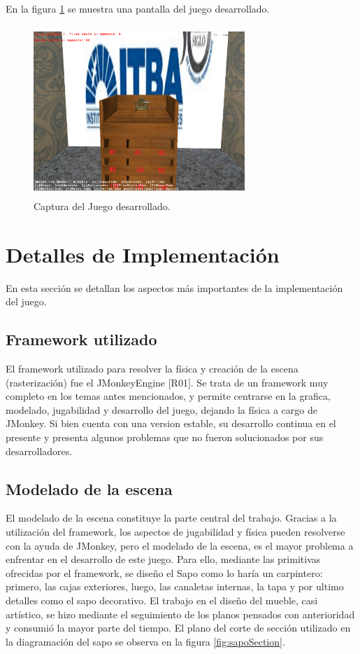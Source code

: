 \documentclass{acm_proc_article-sp}
\begin{document}
En la figura \ref{fig:sapoGame} se muestra una pantalla del juego desarrollado.

\begin{figure}[!ht]
	\centering
		\includegraphics[width=8cm,height=6.45cm]{img/simpleShoot.png}
	\caption{Captura del Juego desarrollado.}
	\label{fig:sapoGame}
\end{figure}


\section{Detalles de Implementaci\'on}
\label{sec:impl}

En esta secci\'on se detallan los aspectos m\'as importantes de la implementaci\'on del juego.
\subsection{Framework utilizado}

El framework utilizado para resolver la f\'isica y creaci\'on de la escena (rasterizaci\'on) fue el JMonkeyEngine [R01]. Se trata de un framework muy completo en los temas antes mencionados, y permite centrarse en la grafica, modelado, jugabilidad y desarrollo del juego, dejando la f\'isica a cargo de JMonkey. Si bien cuenta con una version estable, su desarrollo continua en el presente y presenta algunos problemas que no fueron solucionados por sus desarrolladores. 

\subsection{Modelado de la escena}

El modelado de la escena constituye la parte central del trabajo. Gracias a la utilizaci\'on del framework, los aspectos de jugabilidad y f\'isica pueden resolverse con la ayuda de JMonkey, pero el modelado de la escena, es el mayor problema a enfrentar en el desarrollo de este juego. 
Para ello, mediante las primitivas ofrecidas por el framework, se dise\~no el Sapo como lo har\'ia un carpintero: primero, las cajas exteriores, luego, las canaletas internas, la tapa y por ultimo detalles como el sapo decorativo. El trabajo en el dise\~no del mueble, casi art\'istico, se hizo mediante el seguimiento de los planos pensados con  anterioridad y consumi\'o la mayor parte del tiempo. El plano del corte de secci\'on utilizado en la diagramaci\'on del sapo se observa en la figura \ref{fig:sapoSection}.
\end{document}

